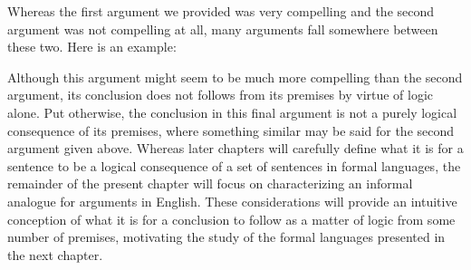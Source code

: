 
Whereas the first argument we provided was very compelling and the second argument was not compelling at all, many arguments fall somewhere between these two.
Here is an example:



\begin{earg}
\end{earg}
 
 
Although this argument might seem to be much more compelling than the second argument, its conclusion does not follows from its premises by virtue of logic alone. 
Put otherwise, the conclusion in this final argument is not a purely logical consequence of its premises, where something similar may be said for the second argument given above.
Whereas later chapters will carefully define what it is for a sentence to be a logical consequence of a set of sentences in formal languages, the remainder of the present chapter will focus on characterizing an informal analogue for arguments in English.
These considerations will provide an intuitive conception of what it is for a conclusion to follow as a matter of logic from some number of premises, motivating the study of the formal languages presented in the next chapter.

